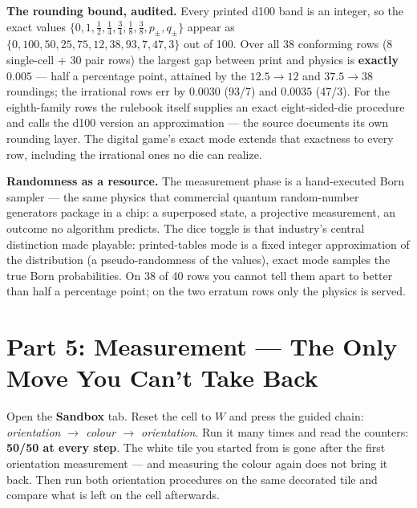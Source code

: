 \documentclass[a4paper,11pt]{article}
\begin{document}
\begin{warningbox}
\textbf{The rounding bound, audited.} Every printed d100 band is an integer, so the
exact values $\{0, 1, \tfrac12, \tfrac14, \tfrac34, \tfrac18, \tfrac38, p_\pm, q_\pm\}$
appear as $\{0, 100, 50, 25, 75, 12, 38, 93, 7, 47, 3\}$ out of 100. Over all 38
conforming rows (8 single-cell + 30 pair rows) the largest gap between print and physics
is \textbf{exactly $0.005$} --- half a percentage point, attained by the $12.5 \to 12$ and
$37.5 \to 38$ roundings; the irrational rows err by $0.0030$ (93/7) and $0.0035$ (47/3).
For the eighth-family rows the rulebook itself supplies an exact eight-sided-die
procedure and calls the d100 version an approximation --- the source documents its own
rounding layer. The digital game's exact mode extends that exactness to every row,
including the irrational ones no die can realize.
\end{warningbox}

\begin{industrybox}
\textbf{Randomness as a resource.} The measurement phase is a hand-executed Born
sampler --- the same physics that commercial quantum random-number generators package in
a chip: a superposed state, a projective measurement, an outcome no algorithm predicts.
The dice toggle is that industry's central distinction made playable: printed-tables
mode is a fixed integer approximation of the distribution (a pseudo-randomness of the
values), exact mode samples the true Born probabilities. On 38 of 40 rows you cannot
tell them apart to better than half a percentage point; on the two erratum rows only
the physics is served.
\end{industrybox}

\section{Part 5: Measurement --- The Only Move You Can't Take Back}

\begin{playbox}
Open the \textbf{Sandbox} tab. Reset the cell to $W$ and press the guided chain:
\emph{orientation $\to$ colour $\to$ orientation}. Run it many times and read the
counters: \textbf{50/50 at every step}. The white tile you started from is gone after
the first orientation measurement --- and measuring the colour again does not bring it
back. Then run both orientation procedures on the same decorated tile and compare what
is left on the cell afterwards.
\end{playbox}
\end{document}
